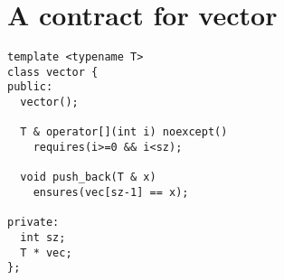 \section{A contract for vector}

\begin{lstlisting}
template <typename T>
class vector {
public:
  vector();

  T & operator[](int i) noexcept()
    requires(i>=0 && i<sz);

  void push_back(T & x) 
    ensures(vec[sz-1] == x);

private:
  int sz;
  T * vec;
};
\end{lstlisting}
